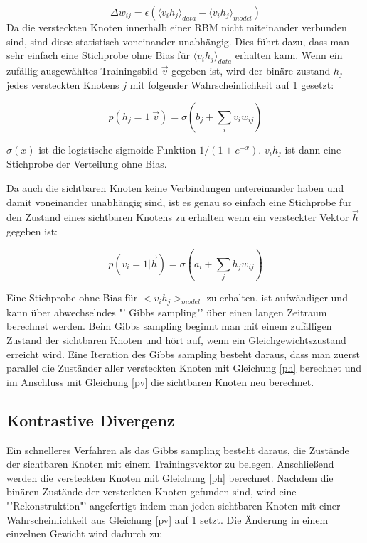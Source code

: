 \documentclass[12pt]{article}
\begin{document}
\begin{equation}
\Delta w_{ij} = \epsilon\left( \langle v_i h_j \rangle_{data} - \langle v_i h_j \rangle_{model} \right)
\end{equation}
Da die versteckten Knoten innerhalb einer RBM nicht miteinander verbunden sind, sind diese statistisch voneinander unabhängig. Dies führt dazu, dass man sehr einfach eine Stichprobe ohne Bias für $\langle v_i h_j \rangle_{data}$ erhalten kann. Wenn ein zufällig ausgewähltes Trainingsbild $\vec{v}$ gegeben ist, wird der binäre zustand $h_j$ jedes versteckten Knotens $j$ mit folgender Wahrscheinlichkeit auf 1 gesetzt:

\begin{equation}
p(h_j = 1 | \vec{v}) = \sigma (b_j + \sum_{i} v_i w_{ij})
\label{ph}
\end{equation}

$\sigma(x)$ ist die logistische sigmoide Funktion $1/(1+e^{-x})$. $v_ih_j$ ist dann eine Stichprobe der Verteilung ohne Bias.

Da auch die sichtbaren Knoten keine Verbindungen untereinander haben und damit voneinander unabhängig sind, ist es genau so einfach eine Stichprobe für den Zustand eines sichtbaren Knotens zu erhalten wenn ein versteckter Vektor $\vec{h}$ gegeben ist:

\begin{equation}
p(v_i =1 | \vec{h}) = \sigma (a_i + \sum_{j} h_j w_{ij})
\label{pv}
\end{equation}

Eine Stichprobe ohne Bias für $<v_i h_j>_{model}$ zu erhalten, ist aufwändiger und kann über abwechselndes "' Gibbs sampling"' über einen langen Zeitraum berechnet werden. Beim Gibbs sampling beginnt man mit einem zufälligen Zustand der sichtbaren Knoten und hört auf, wenn ein Gleichgewichtszustand erreicht wird. Eine Iteration des Gibbs sampling besteht daraus, dass man zuerst parallel die Zuständer aller versteckten Knoten mit Gleichung \ref{ph} berechnet und im Anschluss mit Gleichung \ref{pv} die sichtbaren Knoten neu berechnet.

\subsection{Kontrastive Divergenz}

Ein schnelleres Verfahren als das Gibbs sampling besteht daraus, die Zustände der sichtbaren Knoten mit einem Trainingsvektor zu belegen. Anschließend werden die versteckten Knoten mit Gleichung \ref{ph} berechnet. Nachdem die binären Zustände der versteckten Knoten gefunden sind, wird eine "'Rekonstruktion"' angefertigt indem man jeden sichtbaren Knoten mit einer Wahrscheinlichkeit aus Gleichung \ref{pv} auf 1 setzt. Die Änderung in einem einzelnen Gewicht wird dadurch zu:
\end{document}
